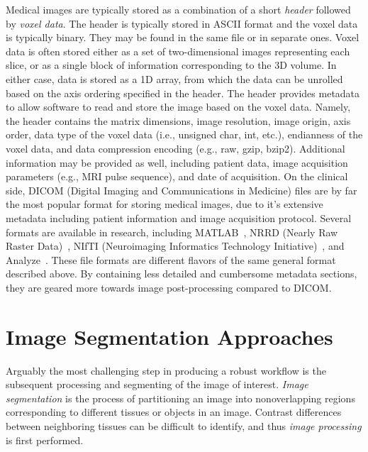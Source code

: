 Medical images are typically stored as a combination of a short \textit{header} followed by \textit{voxel data}. The header is typically stored in ASCII format and the voxel data is typically binary. They may be found in the same file or in separate ones. Voxel data is often stored either as a set of two-dimensional images representing each slice, or as a single block of information corresponding to the 3D volume. In either case, data is stored as a 1D array, from which the data can be unrolled based on the axis ordering specified in the header. The header provides metadata to allow software to read and store the image based on the voxel data. Namely, the header contains the matrix dimensions, image resolution, image origin, axis order, data type of the voxel data (i.e., unsigned char, int, etc.), endianness of the voxel data, and data compression encoding (e.g., raw, gzip, bzip2). Additional information may be provided as well, including patient data, image acquisition parameters (e.g., MRI pulse sequence), and date of acquisition. On the clinical side, DICOM (Digital Imaging and Communications in Medicine) files are by far the most popular format for storing medical images, due to it's extensive metadata including patient information and image acquisition protocol. Several formats are available in research, including MATLAB~\cite{MATLAB}, NRRD (Nearly Raw Raster Data)~\cite{nrrd}, NIfTI (Neuroimaging Informatics Technology Initiative)~\cite{nifti}, and Analyze~\cite{analyze}. These file formats are different flavors of the same general format described above. By containing less detailed and cumbersome metadata sections, they are geared more towards image post-processing compared to DICOM.

\section{Image Segmentation Approaches}
\label{Image Segmentation Approaches}

Arguably the most challenging step in producing a robust workflow is the subsequent processing and segmenting of the image of interest. \textit{Image segmentation} is the process of partitioning an image into nonoverlapping regions corresponding to different tissues or objects in an image. Contrast differences between neighboring tissues can be difficult to identify, and thus \textit{image processing} is first performed.

